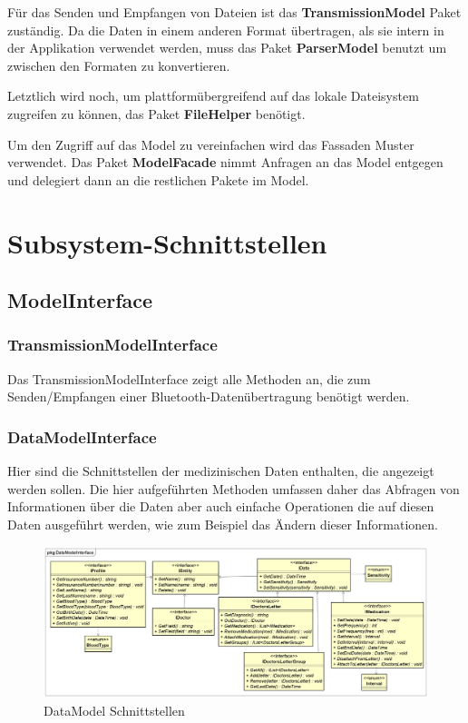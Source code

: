 \documentclass[a4paper]{scrreprt}
\begin{document}
Für das Senden und Empfangen von Dateien ist das \textbf{TransmissionModel} Paket zuständig.
Da die Daten in einem anderen Format übertragen, als sie intern in der Applikation verwendet werden, muss das Paket \textbf{ParserModel} benutzt um zwischen den Formaten zu konvertieren.

Letztlich wird noch, um plattformübergreifend auf das lokale Dateisystem zugreifen zu können, das Paket \textbf{FileHelper} benötigt.

Um den Zugriff auf das Model zu vereinfachen wird das Fassaden Muster verwendet. Das Paket \textbf{ModelFacade} nimmt Anfragen an das Model entgegen und delegiert dann an die restlichen Pakete im Model.

\section{Subsystem-Schnittstellen}
\subsection{ModelInterface}
\subsubsection{TransmissionModelInterface}
Das TransmissionModelInterface zeigt alle Methoden an, die zum Senden/Empfangen einer Bluetooth-Datenübertragung benötigt werden. %
\subsubsection{DataModelInterface}
Hier sind die Schnittstellen der medizinischen Daten enthalten, die angezeigt werden sollen. Die hier aufgeführten Methoden umfassen daher das Abfragen von Informationen über die Daten aber auch einfache Operationen die auf diesen Daten ausgeführt werden, wie zum Beispiel das Ändern dieser Informationen.

\begin{figure}[H]
\centering
\includegraphics[width=0.75\textheight]{graphics/Klassendiagramme/Model/DataModelInterfacePackage.png}
\caption{DataModel Schnittstellen}
\end{figure}
\end{document}
